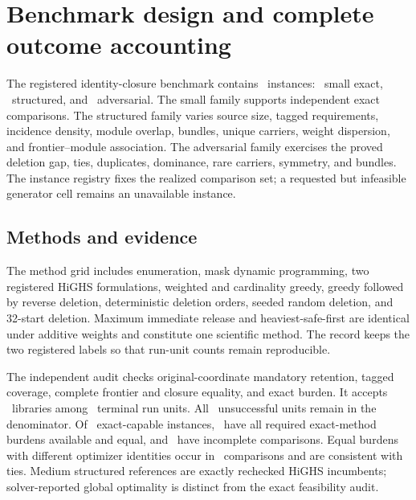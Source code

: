 \section{Benchmark design and complete outcome accounting}
\label{sec:or-algorithmic-benchmark-v2}

The registered identity-closure benchmark contains
\AORBenchmarkInstances\ instances: \AORBenchmarkSmallExact\ small exact,
\AORBenchmarkStructured\ structured, and \AORBenchmarkAdversarial\ adversarial.
The small family supports independent exact comparisons. The structured family
varies source size, tagged requirements, incidence density, module overlap,
bundles, unique carriers, weight dispersion, and frontier--module association.
The adversarial family exercises the proved deletion gap, ties, duplicates,
dominance, rare carriers, symmetry, and bundles. The instance registry fixes
the realized comparison set; a requested but infeasible generator cell remains
an unavailable instance.

\subsection{Methods and evidence}

The method grid includes enumeration, mask dynamic programming, two registered
HiGHS formulations, weighted and cardinality greedy, greedy followed by reverse
deletion, deterministic deletion orders, seeded random deletion, and 32-start
deletion. Maximum immediate release and heaviest-safe-first are identical
under additive weights and constitute one scientific method. The record keeps
the two registered labels so that run-unit counts remain reproducible.

The independent audit checks original-coordinate mandatory retention, tagged
coverage, complete frontier and closure equality, and exact burden. It accepts
\AORBenchmarkAccepted\ libraries among \AORBenchmarkRuns\ terminal run units.
All \AORBenchmarkUnsuccessful\ unsuccessful units remain in the denominator.
Of \AORExactCapable\ exact-capable instances, \AORExactAgreement\ have all
required exact-method burdens available and equal, and \AORExactUnavailable\
have incomplete comparisons. Equal burdens with different optimizer identities
occur in \AOROptimizerIdentityDifferences\ comparisons and are consistent with
ties. Medium structured references are exactly rechecked HiGHS incumbents;
solver-reported global optimality is distinct from the exact feasibility audit.



